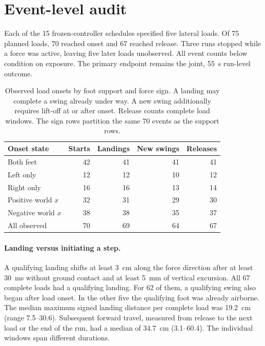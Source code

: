 \section{Event-level audit}
\label{sec:event-audit}
Each of the 15 frozen-controller schedules specified five lateral loads. Of 75 planned loads, 70 reached onset and 67 reached release. Three runs stopped while a force was active, leaving five later loads unobserved. All event counts below condition on exposure. The primary endpoint remains the joint, 55~s run-level outcome.

\begin{table}[ht]
\centering
\small
\caption{Observed load onsets by foot support and force sign. A landing may complete a swing already under way. A new swing additionally requires lift-off at or after onset. Release counts complete load windows. The sign rows partition the same 70 events as the support rows.}
\label{tab:exposure}
\begin{tabular}{@{}lrrrr@{}}
\toprule
Onset state & Starts & Landings & New swings & Releases\\
\midrule
Both feet & 42 & 41 & 41 & 41\\
Left only & 12 & 12 & 10 & 12\\
Right only & 16 & 16 & 13 & 14\\
\midrule
Positive world $x$ & 32 & 31 & 29 & 30\\
Negative world $x$ & 38 & 38 & 35 & 37\\
\midrule
All observed & 70 & 69 & 64 & 67\\
\bottomrule
\end{tabular}
\end{table}

\paragraph{Landing versus initiating a step.}
A qualifying landing shifts at least 3~cm along the force direction after at least 30~ms without ground contact and at least 5~mm of vertical excursion. All 67 complete loads had a qualifying landing. For 62 of them, a qualifying swing also began after load onset. In the other five the qualifying foot was already airborne. The median maximum signed landing distance per complete load was 19.2~cm (range 7.5--30.6). Subsequent forward travel, measured from release to the next load or the end of the run, had a median of 34.7~cm (3.1--60.4). The individual windows span different durations.

